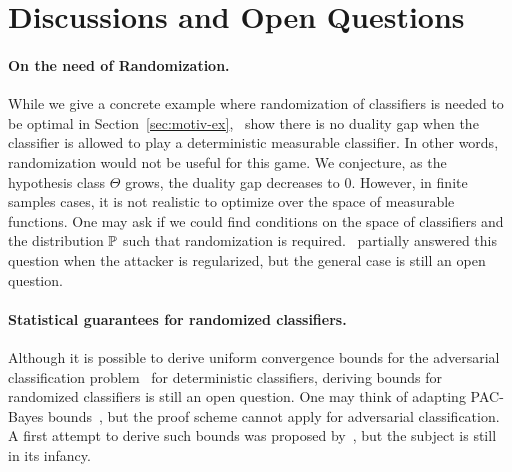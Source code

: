 \section{Discussions and Open Questions}


\paragraph{On the need of Randomization.} While we give a concrete example where randomization of classifiers is needed to be optimal in Section~\ref{sec:motiv-ex},~\citep{pydi2021many} show there is no duality gap when the classifier is allowed to play a deterministic measurable classifier. In other words, randomization would not be useful for this game. We conjecture, as the hypothesis class $\Theta$ grows, the duality gap decreases to $0$. However, in finite samples cases, it is not realistic to optimize over the space of measurable functions. One may ask if we could find conditions on the space of classifiers and the distribution $\mathbb{P}$ such that randomization is required.~\citet{pinot2020randomization} partially answered this question when the attacker is regularized, but the general case is still an open question.

\paragraph{Statistical guarantees for randomized classifiers.} Although it is possible to derive uniform convergence bounds for the adversarial classification problem~\citep{yin2019rademacher,awasthi2020adversarial} for deterministic classifiers, deriving bounds for randomized classifiers is still an open question. One may think of adapting PAC-Bayes bounds~\citep{guedj2019primer}, but the proof scheme cannot apply for adversarial classification. A first attempt to derive such bounds was proposed by~\citet{viallard2021pac}, but the subject is still in its infancy.


